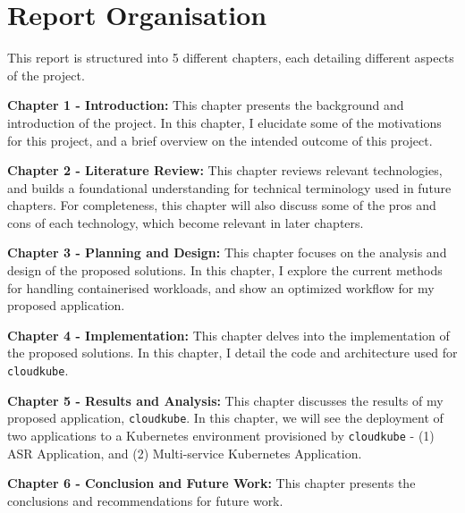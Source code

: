 
\section{Report Organisation}
This report is structured into 5 different chapters, each detailing different aspects of the project.

\textbf{Chapter 1 - Introduction: } This chapter presents the background and introduction of the project. In this chapter, I elucidate some of the motivations for this project, and a brief overview on the intended outcome of this project.

\textbf{Chapter 2 - Literature Review: } This chapter reviews relevant technologies, and builds a foundational understanding for technical terminology used in future chapters. For completeness, this chapter will also discuss some of the pros and cons of each technology, which become relevant in later chapters.

\textbf{Chapter 3 - Planning and Design: } This chapter focuses on the analysis and design of the proposed solutions. In this chapter, I explore the current methods for handling containerised workloads, and show an optimized workflow for my proposed application.

\textbf{Chapter 4 - Implementation: } This chapter delves into the implementation of the proposed solutions. In this chapter, I detail the code and architecture used for \texttt{cloudkube}.

\textbf{Chapter 5 - Results and Analysis: } This chapter discusses the results of my proposed application, \texttt{cloudkube}. In this chapter, we will see the deployment of two applications to a Kubernetes environment provisioned by \texttt{cloudkube} - (1) ASR Application, and (2) Multi-service Kubernetes Application.

\textbf{Chapter 6 - Conclusion and Future Work: } This chapter presents the conclusions and recommendations for future work. 